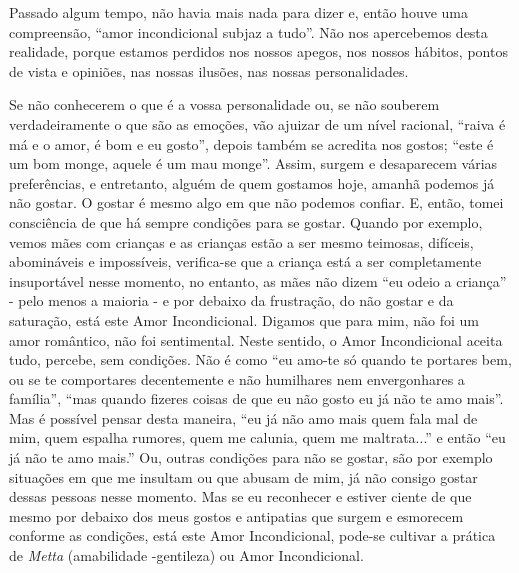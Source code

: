 Passado algum tempo, não havia mais nada para dizer e, então houve uma
compreensão, ``amor incondicional subjaz a tudo''. Não nos apercebemos
desta realidade, porque estamos perdidos nos nossos apegos, nos nossos
hábitos, pontos de vista e opiniões, nas nossas ilusões, nas nossas
personalidades.

Se não conhecerem o que é a vossa personalidade ou, se não souberem
verdadeiramente o que são as emoções, vão ajuizar de um nível racional,
``raiva é má e o amor, é bom e eu gosto'', depois também se acredita nos
gostos; ``este é um bom monge, aquele é um mau monge''. Assim, surgem e
desaparecem várias preferências, e entretanto, alguém de quem gostamos
hoje, amanhã podemos já não gostar. O gostar é mesmo algo em que não
podemos confiar. E, então, tomei consciência de que há sempre condições
para se gostar. Quando por exemplo, vemos mães com crianças e as
crianças estão a ser mesmo teimosas, difíceis, abomináveis e
impossíveis, verifica-se que a criança está a ser completamente
insuportável nesse momento, no entanto, as mães não dizem ``eu odeio a
criança'' - pelo menos a maioria - e por debaixo da frustração, do não
gostar e da saturação, está este Amor Incondicional. Digamos que para
mim, não foi um amor romântico, não foi sentimental. Neste sentido, o
Amor Incondicional aceita tudo, percebe, sem condições. Não é como ``eu
amo-te só quando te portares bem, ou se te comportares decentemente e
não humilhares nem envergonhares a família'', ``mas quando fizeres
coisas de que eu não gosto eu já não te amo mais''. Mas é possível
pensar desta maneira, ``eu já não amo mais quem fala mal de mim, quem
espalha rumores, quem me calunia, quem me maltrata...'' e então ``eu já
não te amo mais.'' Ou, outras condições para não se gostar, são por
exemplo situações em que me insultam ou que abusam de mim, já não
consigo gostar dessas pessoas nesse momento. Mas se eu reconhecer e
estiver ciente de que mesmo por debaixo dos meus gostos e antipatias que
surgem e esmorecem conforme as condições, está este Amor Incondicional,
pode-se cultivar a prática de \emph{Metta} (amabilidade -gentileza) ou
Amor Incondicional.

